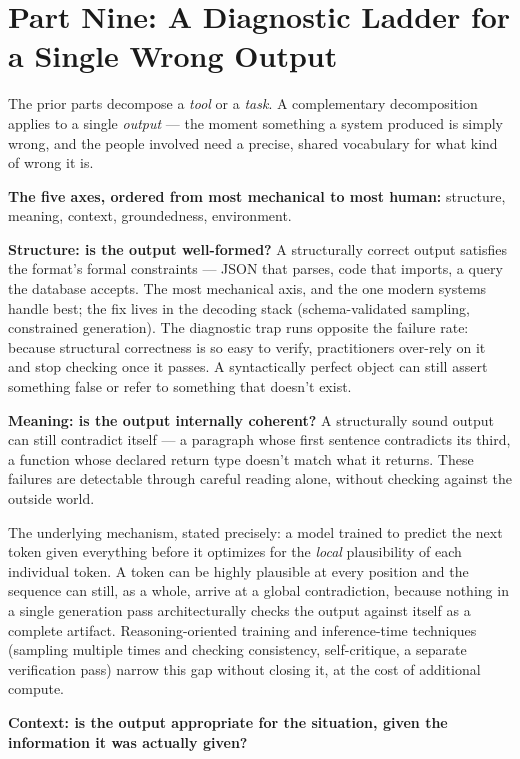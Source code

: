 \section{Part Nine: A Diagnostic Ladder for a Single Wrong Output}

The prior parts decompose a \emph{tool} or a \emph{task}. A complementary decomposition applies to a single \emph{output} --- the moment something a system produced is simply wrong, and the people involved need a precise, shared vocabulary for what kind of wrong it is.

\textbf{The five axes, ordered from most mechanical to most human:} structure, meaning, context, groundedness, environment.

\textbf{Structure: is the output well-formed?} A structurally correct output satisfies the format's formal constraints --- JSON that parses, code that imports, a query the database accepts. The most mechanical axis, and the one modern systems handle best; the fix lives in the decoding stack (schema-validated sampling, constrained generation). The diagnostic trap runs opposite the failure rate: because structural correctness is so easy to verify, practitioners over-rely on it and stop checking once it passes. A syntactically perfect object can still assert something false or refer to something that doesn't exist.

\textbf{Meaning: is the output internally coherent?} A structurally sound output can still contradict itself --- a paragraph whose first sentence contradicts its third, a function whose declared return type doesn't match what it returns. These failures are detectable through careful reading alone, without checking against the outside world.

The underlying mechanism, stated precisely: a model trained to predict the next token given everything before it optimizes for the \emph{local} plausibility of each individual token. A token can be highly plausible at every position and the sequence can still, as a whole, arrive at a global contradiction, because nothing in a single generation pass architecturally checks the output against itself as a complete artifact. Reasoning-oriented training and inference-time techniques (sampling multiple times and checking consistency, self-critique, a separate verification pass) narrow this gap without closing it, at the cost of additional compute.

\textbf{Context: is the output appropriate for the situation, given the information it was actually given?}

